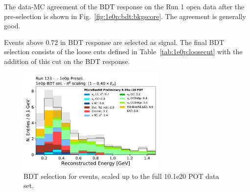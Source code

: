 
The data-MC agreement of the BDT response on the Run 1 open data after the \zpsel pre-selection is shown in Fig.~\ref{fig:1e0p:bdt:bkgscore}. The agreement is generally good.  


Events above 0.72 in BDT response are selected as signal. The final BDT selection consists of the loose cuts defined in Table~\ref{tab:1e0p:loosecut} with the addition of this cut on the BDT response.

\begin{figure}[H]
\begin{center}
\includegraphics[width=0.65\textwidth]{1e0p/run123_bdt/reco_e_nodata_08052020.pdf}
\caption{\label{fig:1e0p:bdt:loosebdt} BDT selection for \zpsel events, scaled up to the full 10.1e20 POT data set.}
\end{center}
\end{figure}

